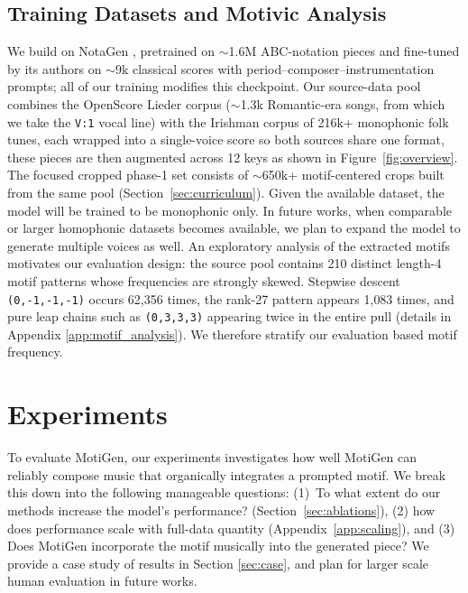 \documentclass{article}
\newcommand{\motif}[1]{\texttt{(#1)}}
\newcommand{\method}{MotiGen}
\begin{document}
\subsection{Training Datasets and Motivic Analysis}
\label{sec:data}

We build on NotaGen \citep{wang2025notagen}, pretrained on $\sim$1.6M ABC-notation pieces and fine-tuned by its authors on $\sim$9k classical scores with period--composer--instrumentation prompts; all of our training modifies this checkpoint. Our source-data pool combines the OpenScore Lieder corpus \citep{gotham2022lieder} ($\sim$1.3k Romantic-era songs, from which we take the \texttt{V:1} vocal line) with the Irishman corpus \citep{irishman2023} of 216k+ monophonic folk tunes, each wrapped into a single-voice score so both sources share one format, these pieces are then augmented across 12 keys as shown in Figure~\ref{fig:overview}. The focused cropped phase-1 set consists of $\sim$650k+ motif-centered crops built from the same pool (Section~\ref{sec:curriculum}). Given the available dataset, the model will be trained to be monophonic only. In future works, when comparable or larger homophonic datasets becomes available, we plan to expand the model to generate multiple voices as well.
An exploratory analysis of the extracted motifs motivates our evaluation design: the source pool contains 210 distinct length-4 motif patterns whose frequencies are strongly skewed. Stepwise descent \motif{0,-1,-1,-1} occurs 62{,}356 times, the rank-27 pattern appears 1{,}083 times, and pure leap chains such as \motif{0,3,3,3} appearing twice in the entire pull (details in Appendix \ref{app:motif_analysis}). We therefore stratify our evaluation based motif frequency.

\section{Experiments}
\label{sec:experiments}


To evaluate \method{}, our experiments investigates how well \method{} can reliably compose music that organically integrates a prompted motif. We break this down into the following manageable questions: (1)~To what extent do our methods increase the model's performance? (Section~\ref{sec:ablations}), (2) how does performance scale with full-data quantity (Appendix~\ref{app:scaling}), and (3) Does \method{} incorporate the motif musically into the generated piece? We provide a case study of results in Section \ref{sec:case}, and plan for larger scale human evaluation in future works. 
\end{document}

